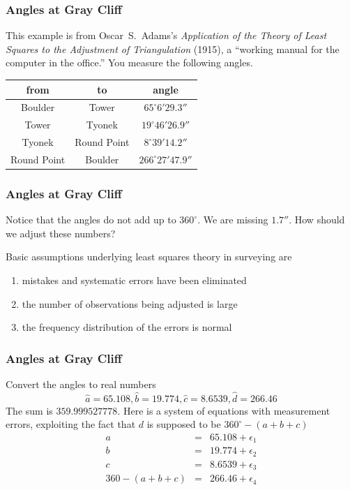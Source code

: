 \documentclass[xcolor=dvipsnames]{beamer}
\begin{document}
\begin{frame}
  \frametitle{Angles at Gray Cliff}
   This example is from \mbox{Oscar S.
    Adams's} \emph{Application of the Theory of Least Squares to the
    Adjustment of Triangulation} (1915), a ``working manual for the
  computer in the office.'' You measure the following angles.

  \medskip
  
  \begin{tabular}{|c|c|c|}\hline
    from & to & angle \\ \hline
    Boulder & Tower & $65^{\circ}6'29.3''$ \\ \hline
    Tower & Tyonek & $19^{\circ}46'26.9''$ \\ \hline
    Tyonek & Round Point & $8^{\circ}39'14.2''$ \\ \hline
    Round Point & Boulder & $266^{\circ}27'47.9''$ \\ \hline
  \end{tabular}
\end{frame}

\begin{frame}
  \frametitle{Angles at Gray Cliff}
  Notice that the angles do not add up to $360^{\circ}$. We are
  missing $1.7''$. How should we adjust these numbers?

  \medskip

  Basic assumptions underlying least squares theory in surveying are
  \begin{enumerate}
  \item mistakes and systematic errors have been eliminated
  \item the number of observations being adjusted is large
  \item the frequency distribution of the errors is normal
  \end{enumerate}
\end{frame}

\begin{frame}
  \frametitle{Angles at Gray Cliff}
  Convert the angles to real numbers
  \begin{equation}
    \label{eq:maeshoga}
    \hat{a}=65.108,\hat{b}=19.774,\hat{c}=8.6539,\hat{d}=266.46
  \end{equation}
  The sum is $359.999527778$. Here is a system of equations with
  measurement errors, exploiting the fact that $d$ is supposed to be
  $360^{\circ}-(a+b+c)$
\begin{equation}
  \label{eq:puzeiboo}
  \begin{array}{ccc}
    a&=&65.108+\epsilon_{1} \\
    b&=&19.774+\epsilon_{2} \\
    c&=&8.6539+\epsilon_{3} \\
    360-(a+b+c)&=&266.46+\epsilon_{4}
  \end{array}
\end{equation}
\end{frame}
\end{document}
